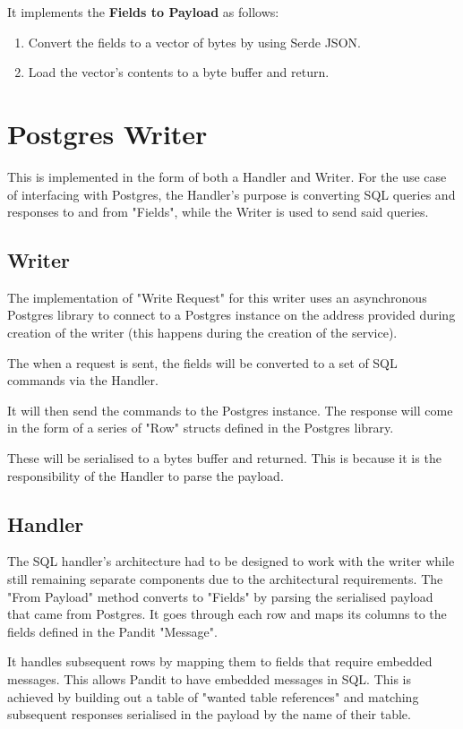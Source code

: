 \documentclass[a4paper,12pt]{report}
\begin{document}
It implements the \textbf{Fields to Payload} as follows:
\begin{enumerate}
    \item Convert the fields to a vector of bytes by using Serde JSON.
    \item Load the vector's contents to a byte buffer and return.
\end{enumerate}

\section{Postgres Writer}
\label{im:postgres}
This is implemented in the form of both a Handler and Writer. 
For the use case of interfacing with Postgres, the Handler's purpose is converting SQL queries and responses to and from "Fields", while the Writer is used to send said queries.

\subsection{Writer}
The implementation of "Write Request" for this writer uses an asynchronous Postgres library to connect to a Postgres instance on the address provided during creation of the writer (this happens during the creation of the service).

The when a request is sent, the fields will be converted to a set of SQL commands via the Handler.

It will then send the commands to the Postgres instance. The response will come in the form of a series of "Row" structs defined in the Postgres library.

These will be serialised to a bytes buffer and returned. This is because it is the responsibility of the Handler to parse the payload.

\subsection{Handler}
The SQL handler's architecture had to be designed to work with the writer while still remaining separate components due to the architectural requirements.
The "From Payload" method converts to "Fields" by parsing the serialised payload that came from Postgres.
It goes through each row and maps its columns to the fields defined in the Pandit "Message".

It handles subsequent rows by mapping them to fields that require embedded messages. This allows Pandit to have embedded messages in SQL. 
This is achieved by building out a table of "wanted table references" and matching subsequent responses serialised in the payload by the name of their table.
\end{document}
